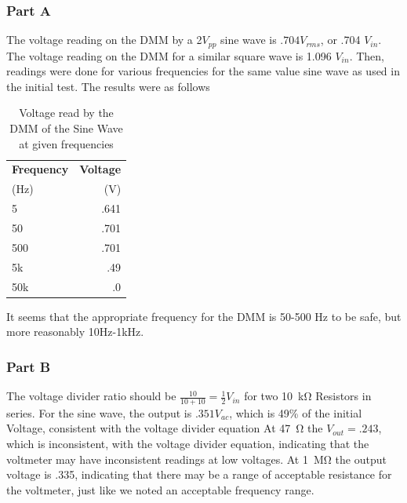 \documentclass[10pt]{article}
\begin{document}
\subsubsection{Part A}

	 The voltage reading on the DMM by a 2$V_{pp}$ sine wave is $.704 V_{rms}$, or .704 $V_{in}$. The voltage reading on the DMM for a similar square wave is 1.096 $V_{in}$. Then, readings were done for various frequencies for the same value sine wave as used in the initial test. The results were as follows
	\begin{table}[H]
		\begin{center}
			\caption{Voltage read by the DMM of the Sine Wave at given frequencies}
			\label{tab: 31A}
			\begin{tabular}{l|r}
				\textbf{Frequency} & \textbf{Voltage}\\
				(Hz) & (V)\\
				\hline
				5 & .641\\
				50 & .701\\
				500 & .701\\
				5k & .49\\
				50k & .0\\
			\end{tabular}
		\end{center}
	\end{table}
	It seems that the appropriate frequency for the DMM is 50-500 Hz to be safe, but more reasonably 10Hz-1kHz.
\subsubsection{Part B}
	 The voltage divider ratio should be $\frac{10}{10+10} = \frac{1}{2} V_{in}$  for two \SI{10}{\kilo\ohm} Resistors in series. For the sine wave, the output is $.351 V_{ac}$, which is 49\% of the initial Voltage, consistent with the voltage divider equation 
	 At \SI{47}{\ohm} the $V_{out} = .243$, which is inconsistent, with the voltage divider equation, indicating that the voltmeter may have inconsistent readings at low voltages. 
	 At \SI{1}{\mega\ohm} the output voltage is .335, indicating that there may be a range of acceptable resistance for the voltmeter, just like we noted an acceptable frequency range. \\\\
\end{document}
